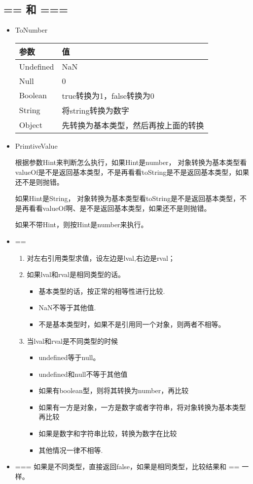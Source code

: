 \subsection{== 和 ===}

\begin{itemize}
\item ToNumber

\begin{tabular}{|l|l|}
\hline
参数 & 值 \\
\hline
Undefined & NaN \\
\hline
Null & 0 \\
\hline
Boolean & true转换为1，false转换为0 \\
\hline
String & 将string转换为数字 \\
\hline
Object & 先转换为基本类型，然后再按上面的转换 \\
\hline
\end{tabular}

\item PrimtiveValue

根据参数Hint来判断怎么执行，如果Hint是number，
对象转换为基本类型看valueOf是不是返回基本类型，不是再看看toString是不是返回基本类型，如果还不是则抛错。

如果Hint是String，
对象转换为基本类型看toString是不是返回基本类型，不是再看看valueOf啊、是不是返回基本类型，如果还不是则抛错。

如果不带Hint，则按Hint是number来执行。
\end{itemize}

\begin{itemize}
\item == 

\begin{enumerate}
\item 对左右引用类型求值，设左边是lval,右边是rval；
\item 如果lval和rval是相同类型的话。
	\begin{itemize}
	\item 基本类型的话，按正常的相等性进行比较.
	\item NaN不等于其他值.
	\item 不是基本类型时，如果不是引用同一个对象，则两者不相等。
	\end{itemize}
\item 当lval和rval是不同类型的时候
	\begin{itemize}
	\item undefined等于null。
	\item undefined和null不等于其他值
	\item 如果有boolean型，则将其转换为number，再比较
	\item 如果有一方是对象，一方是数字或者字符串，将对象转换为基本类型再比较
	\item 如果是数字和字符串比较，转换为数字在比较
	\item 其他情况一律不相等.
	\end{itemize}
\end{enumerate}

\item ===
如果是不同类型，直接返回false，如果是相同类型，比较结果和 == 一样。
\end{itemize}

